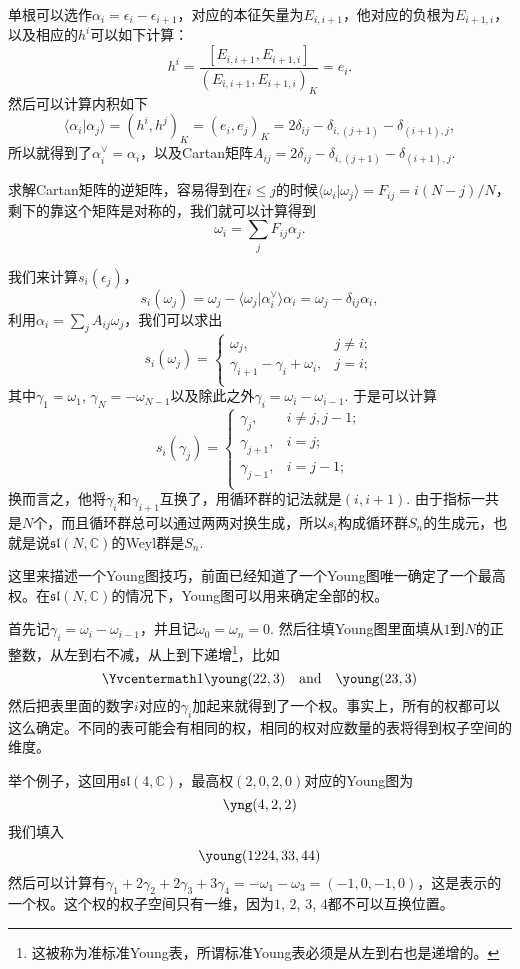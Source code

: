 \documentclass[9pt]{extarticle}
\newcommand{\cc}{\mathbb{C}}
\begin{document}
\para 单根可以选作$\alpha_i = \epsilon_i-\epsilon_{i+1}$，对应的本征矢量为$E_{i,i+1}$，他对应的负根为$E_{i+1,i}$，以及相应的$h^i$可以如下计算：
\[
	h^i=\frac{[E_{i,i+1},E_{i+1,i}]}{(E_{i,i+1},E_{i+1,i})_K}=e_i.
\]
然后可以计算内积如下
\[
	\langle \alpha_i|\alpha_j\rangle = (h^i,h^j)_K=(e_i,e_j)_K=2\delta_{ij}-\delta_{i,(j+1)}-\delta_{(i+1),j},
\]
所以就得到了$\alpha^\vee_i=\alpha_i$，以及Cartan矩阵$A_{ij}=2\delta_{ij}-\delta_{i,(j+1)}-\delta_{(i+1),j}$. 

求解Cartan矩阵的逆矩阵，容易得到在$i\leq j$的时候$\langle \omega_i|\omega_j\rangle=F_{ij}=i(N-j)/N$，剩下的靠这个矩阵是对称的，我们就可以计算得到
\[
	\omega_i=\sum_j F_{ij}\alpha_j.
\]

\para 我们来计算$s_i(\epsilon_j)$，
\[
	s_i(\omega_j)=\omega_j-\langle \omega_j|\alpha^\vee_i\rangle\alpha_i=\omega_j-\delta_{ij}\alpha_i,
\]
利用$\alpha_{i}=\sum_j A_{ij}\omega_j$，我们可以求出
\[
	s_i(\omega_j)=
	\begin{cases}
	\omega_j, & j\neq i;\\
	\gamma_{i+1}-\gamma_{i}+\omega_{i}, & j=i;\\
	\end{cases}
\]
其中$\gamma_{1}=\omega_1$, $\gamma_N=-\omega_{N-1}$以及除此之外$\gamma_i=\omega_{i}-\omega_{i-1}$. 于是可以计算
\[
	s_i(\gamma_{j})=
	\begin{cases}
	\gamma_{j}, & i\neq j,j-1;\\
	\gamma_{j+1}, & i=j;\\
	\gamma_{j-1}, & i=j-1;\\
	\end{cases}
\]
换而言之，他将$\gamma_i$和$\gamma_{i+1}$互换了，用循环群的记法就是$(i,i+1)$. 由于指标一共是$N$个，而且循环群总可以通过两两对换生成，所以$s_i$构成循环群$S_n$的生成元，也就是说$\mathfrak{sl}(N,\cc)$的Weyl群是$S_n$.

\para 这里来描述一个Young图技巧，前面已经知道了一个Young图唯一确定了一个最高权。在$\mathfrak{sl}(N,\cc)$的情况下，Young图可以用来确定全部的权。

首先记$\gamma_i=\omega_i-\omega_{i-1}$，并且记$\omega_0=\omega_n=0$. 然后往填Young图里面填从$1$到$N$的正整数，从左到右不减，从上到下递增\footnote{这被称为准标准Young表，所谓标准Young表必须是从左到右也是递增的。}，比如
\[
\Yvcentermath1
	\young(22,3)\quad \text{and}\quad \young(23,3)
\]
然后把表里面的数字$i$对应的$\gamma_i$加起来就得到了一个权。事实上，所有的权都可以这么确定。不同的表可能会有相同的权，相同的权对应数量的表将得到权子空间的维度。

举个例子，这回用$\mathfrak{sl}(4,\cc)$，最高权$(2,0,2,0)$对应的Young图为
\[
	\yng(4,2,2)
\]
我们填入
\[
	\young(1224,33,44)
\]
然后可以计算有$\gamma_1+2\gamma_2+2\gamma_3+3\gamma_4=-\omega_1-\omega_3=(-1,0,-1,0)$，这是表示的一个权。这个权的权子空间只有一维，因为$1$, $2$, $3$, $4$都不可以互换位置。
\end{document}
